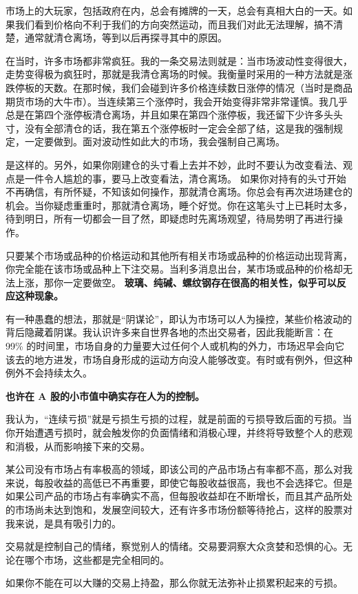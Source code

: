 市场上的大玩家，包括政府在内，总会有摊牌的一天，总会有真相大白的一天。如果我们看到价格向不利于我们的方向突然运动，而且我们对此无法理解，搞不清楚，通常就清仓离场，等到以后再探寻其中的原因。

\begin{tcolorbox}[title=最为重要的是，你出场做得非常好。是什么东西向你发出警示，让你感觉价格已接近顶部（或底部）？]
    在当时，许多市场都非常疯狂。我的一条交易法则就是：当市场波动性变得很大，走势变得极为疯狂时，那就是我清仓离场的时候。我衡量时采用的一种方法就是涨跌停板的天数。在那时候，我们会碰到许多价格连续数日涨停的情况（当时是商品期货市场的大牛市）。当连续第三个涨停时，我会开始变得非常非常谨慎。我几乎总是在第四个涨停板清仓离场，并且如果在第四个涨停板，我还留下少许多头头寸，没有全部清仓的话，我在第五个涨停板时一定会全部了结，这是我的强制规定，一定要做到。面对波动性如此大的市场，我会强制自己离场。
\end{tcolorbox}

\begin{tcolorbox}[title=当你下达进场建仓的交易订单时，一定伴有清仓离场的交易订单？]
    是这样的。另外，如果你刚建仓的头寸看上去并不妙，此时不要认为改变看法、观点是一件令人尴尬的事，要马上改变看法，清仓离场。
    \tcblower
    如果你对持有的头寸开始不再确信，有所怀疑，不知该如何操作，那就清仓离场。你总会有再次进场建仓的机会。当你疑虑重重时，那就清仓离场，睡个好觉。你在这笔头寸上已耗时太多，待到明日，所有一切都会一目了然，即疑虑时先离场观望，待局势明了再进行操作。
\end{tcolorbox}

\begin{tcolorbox}[title=如果你已发现各市场或品种共有的价格行为，那么“一旦某上涨滞后的市场或品种率先开始下跌，你就做空该市场或品种”，这是否是必然的交易法则？]
    只要某个市场或品种的价格运动和其他所有相关市场或品种的价格运动出现背离，你完全能在该市场或品种上下注交易。当利多消息出台，某市场或品种的价格却无法上涨，那你一定要做空。
    \tcblower
    \textbf{玻璃、纯碱、螺纹钢存在很高的相关性，似乎可以反应这种现象。}
\end{tcolorbox}

有一种愚蠢的想法，那就是“阴谋论”，即认为市场可以人为操控，某些价格波动的背后隐藏着阴谋。我认识许多来自世界各地的杰出交易者，因此我能断言：在 99\% 的时间里，市场自身的力量要大过任何个人或机构的外力，市场迟早会向它该去的地方进发，市场自身形成的运动方向没人能够改变。有时或有例外，但这种例外不会持续太久。

\textbf{也许在 A 股的小市值中确实存在人为的控制。}

我认为，“连续亏损”就是亏损生亏损的过程，就是前面的亏损导致后面的亏损。当你开始遭遇亏损时，就会触发你的负面情绪和消极心理，并终将导致整个人的悲观和消极，从而影响接下来的交易。

某公司没有市场占有率极高的领域，即该公司的产品市场占有率都不高，那么对我来说，每股收益的高低已不再重要，即使它每股收益很高，我也不会选择它。但是如果公司产品的市场占有率确实不高，但每股收益却在不断增长，而且其产品所处的市场尚未达到饱和，发展空间较大，还有许多市场份额等待抢占，这样的股票对我来说，是具有吸引力的。

交易就是控制自己的情绪，察觉别人的情绪。交易要洞察大众贪婪和恐惧的心。无论在哪个市场，这些都是完全相同的。

如果你不能在可以大赚的交易上持盈，那么你就无法弥补止损累积起来的亏损。
